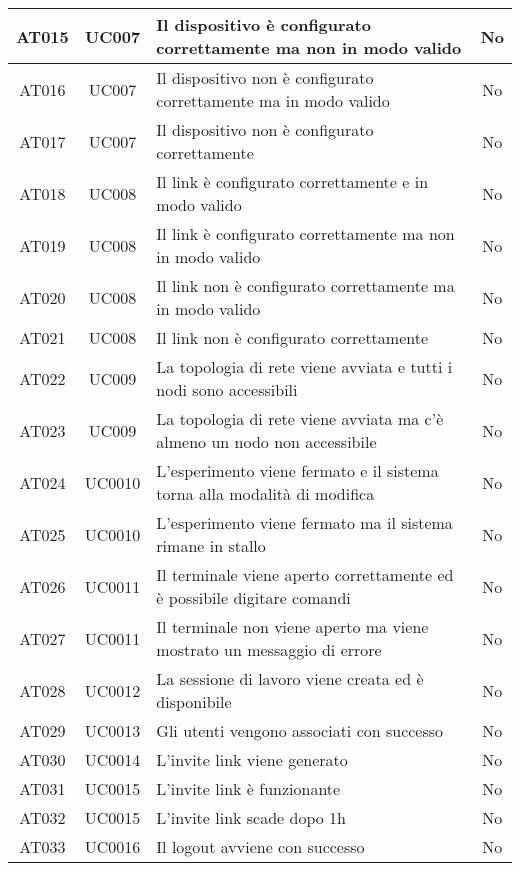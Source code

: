 \documentclass[../main.tex]{subfiles}
\begin{document}
\begin{tabularx}{\linewidth}{|c|c|X|c|}
    AT015       & UC007    & Il dispositivo è configurato correttamente ma non in modo valido & No \\ \hline
    AT016       & UC007    & Il dispositivo non è configurato correttamente ma in modo valido & No \\ \hline
    AT017       & UC007    & Il dispositivo non è configurato correttamente & No \\ \hline
    AT018       & UC008    & Il link è configurato correttamente e in modo valido & No \\ \hline
    AT019       & UC008    & Il link è configurato correttamente ma non in modo valido & No \\ \hline
    AT020       & UC008    & Il link non è configurato correttamente ma in modo valido & No \\ \hline
    AT021       & UC008    & Il link non è configurato correttamente  & No \\ \hline
    AT022       & UC009    & La topologia di rete viene avviata e tutti i nodi sono accessibili & No \\ \hline
    AT023       & UC009    & La topologia di rete viene avviata ma c'è almeno un nodo non accessibile & No \\ \hline
    AT024       & UC0010    & L'esperimento viene fermato e il sistema torna alla modalità di modifica & No \\ \hline
    AT025       & UC0010    & L'esperimento viene fermato ma il sistema rimane in stallo & No \\ \hline
    AT026       & UC0011    & Il terminale viene aperto correttamente ed è possibile digitare comandi & No \\ \hline
    AT027       & UC0011    & Il terminale non viene aperto ma viene mostrato un messaggio di errore & No \\ \hline
    AT028       & UC0012    & La sessione di lavoro viene creata ed è disponibile & No \\ \hline
    AT029       & UC0013    & Gli utenti vengono associati con successo & No \\ \hline
    AT030       & UC0014    & L'invite link viene generato & No \\ \hline
    AT031       & UC0015    & L'invite link è funzionante & No \\ \hline
    AT032       & UC0015    & L'invite link scade dopo 1h & No \\ \hline
    AT033       & UC0016    & Il logout avviene con successo & No \\ \hline
\end{tabularx}
\end{document}
